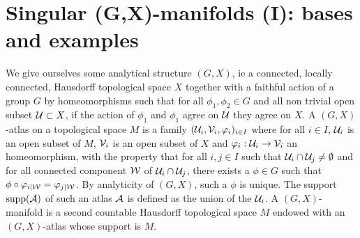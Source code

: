 \section{Singular (G,X)-manifolds (I): bases and examples}\label{sec:GXsing}

We give ourselves some analytical structure $(G,X)$, ie a connected, locally connected, Hausdorff topological space $X$ together with a faithful action of a group $G$ by homeomorphisms such that for all $\phi_1,\phi_2\in G$ and all non trivial open subset $\mathcal{U}\subset X$, if the action of $\phi_1$ and $\phi_1$ agree on $\mathcal{U}$ they agree on $X$.
A $(G,X)$-atlas on a topological space $M$ is a family $(\mathcal{U}_i,\mathcal V_i,\varphi_i)_{i\in I}$ where for all  $i\in I$, $\mathcal{U}_i$ is an open subset of $M$, $\mathcal V_i$ is an open subset of $X$ and $\varphi_i:\mathcal{U}_i\rightarrow \mathcal V_i$ an homeomorphism, with the property that for all $i,j\in I$ such that $\mathcal{U}_i\cap \mathcal{U}_j\neq \emptyset$ and for all connected component $\mathcal W$ of $\mathcal{U}_i\cap \mathcal{U}_j$, there exists a $\phi \in G$ such that $\phi\circ \varphi_{i|\mathcal W} = \varphi_{j|\mathcal W}$. By analyticity of $(G,X)$, such a $\phi$ is unique. The support $\mathrm{supp}(\mathcal A)$ of such an atlas $\mathcal A$ is defined as the union of the $\mathcal{U}_i$. 
A $(G,X)$-manifold is a second countable Hausdorff topological space $M$ endowed with an $(G,X)$-atlas whose support is $M$.

